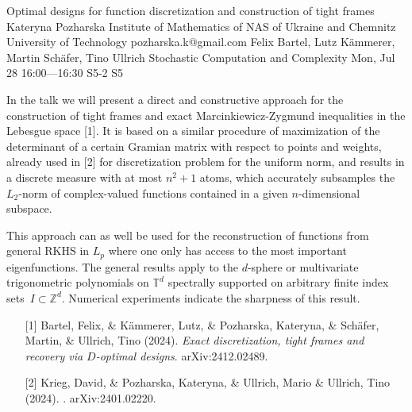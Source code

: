 \begin{talk}
  {Optimal designs for function discretization and construction of tight frames}%
  {Kateryna Pozharska}%
  {Institute of Mathematics of NAS of Ukraine and Chemnitz University of Technology}%
  {pozharska.k@gmail.com}%
  {Felix Bartel,  Lutz K\"ammerer,  Martin Sch\"afer, Tino Ullrich}%
  {Stochastic Computation and Complexity}%
  {Mon, Jul 28 16:00---16:30}%
  {S5-2}%
  {S5}%
    


In the talk we will present a direct and constructive approach for the construction of tight frames and exact Marcinkiewicz-Zygmund inequalities in the Lebesgue space [1]. 
It is based on a similar procedure of maximization of the determinant of a certain Gramian matrix with respect to points and weights, already used in [2] for discretization problem for the uniform norm, and results in a discrete measure  with at most $n^2+1$ atoms, which accurately subsamples the $L_2$-norm of complex-valued functions contained in a  given $n$-dimensional subspace.

This approach can as well be used for the reconstruction of functions from general RKHS in $L_p$ where one only has access to the most important eigenfunctions. The general results apply to the $d$-sphere or multivariate trigonometric polynomials on $\mathbb{T}^d$ spectrally supported on arbitrary finite index sets~$I \subset \mathbb{Z}^d$.  Numerical experiments indicate the sharpness of this result. 


\begin{enumerate}
 \item[{[1]}]  Bartel, Felix,  \& K\"ammerer, Lutz,  \& Pozharska,  Kateryna, \& Sch\"afer, Martin,  \& \newline Ullrich, Tino (2024). {\it Exact discretization, tight frames and recovery via $D$-optimal designs}. arXiv:2412.02489.
    
 \item[{[2]}] Krieg, David, \&  Pozharska, Kateryna, \& Ullrich, Mario \&  Ullrich, Tino (2024). . arXiv:2401.02220.

\end{enumerate}


\end{talk}

